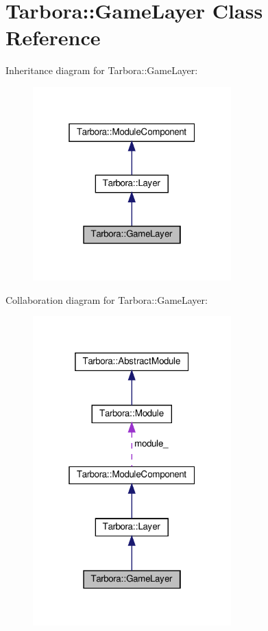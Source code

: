 \hypertarget{classTarbora_1_1GameLayer}{}\section{Tarbora\+:\+:Game\+Layer Class Reference}
\label{classTarbora_1_1GameLayer}


Inheritance diagram for Tarbora\+:\+:Game\+Layer\+:
\nopagebreak
\begin{figure}[H]
\begin{center}
\leavevmode
\includegraphics[width=217pt]{classTarbora_1_1GameLayer__inherit__graph}
\end{center}
\end{figure}


Collaboration diagram for Tarbora\+:\+:Game\+Layer\+:
\nopagebreak
\begin{figure}[H]
\begin{center}
\leavevmode
\includegraphics[width=217pt]{classTarbora_1_1GameLayer__coll__graph}
\end{center}
\end{figure}
